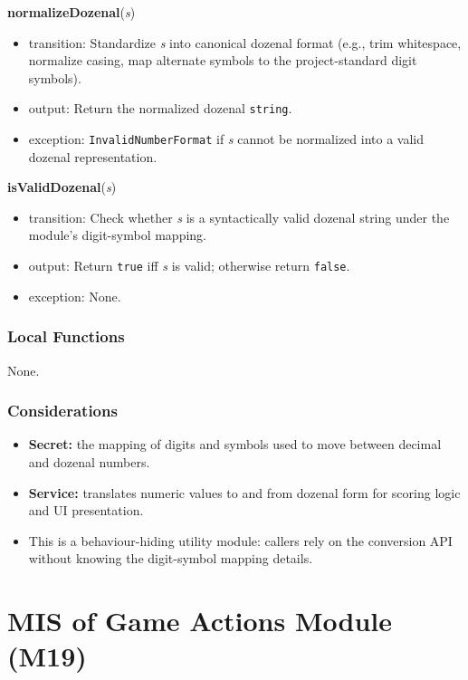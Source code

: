 \documentclass[12pt, titlepage]{article}
\begin{document}
\noindent\textbf{normalizeDozenal}(\textit{s})
\begin{itemize}
    \item transition: Standardize \textit{s} into canonical dozenal format (e.g., trim whitespace, normalize casing, map alternate symbols to the project-standard digit symbols).
    \item output: Return the normalized dozenal \texttt{string}.
    \item exception: \texttt{InvalidNumberFormat} if \textit{s} cannot be normalized into a valid dozenal representation.
\end{itemize}

\noindent\textbf{isValidDozenal}(\textit{s})
\begin{itemize}
    \item transition: Check whether \textit{s} is a syntactically valid dozenal string under the module's digit-symbol mapping.
    \item output: Return \texttt{true} iff \textit{s} is valid; otherwise return \texttt{false}.
    \item exception: None.
\end{itemize}

\subsubsection{Local Functions}
None.

\subsubsection{Considerations}
\begin{itemize}
    \item \textbf{Secret:} the mapping of digits and symbols used to move between decimal and dozenal numbers.
    \item \textbf{Service:} translates numeric values to and from dozenal form for scoring logic and UI presentation.
    \item This is a behaviour-hiding utility module: callers rely on the conversion API without knowing the digit-symbol mapping details.
\end{itemize}


\newpage
\section{MIS of Game Actions Module (M19)}\label{sec:game-actions-module}
\end{document}
